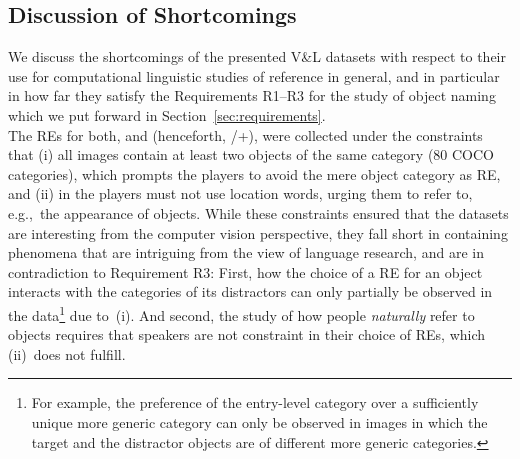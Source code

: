 {

\subsection{Discussion of Shortcomings}
We discuss the shortcomings of the presented V\&L datasets with respect to their use for computational linguistic studies of reference in general, and in particular in how far they satisfy the Requirements R1--R3 for the study of object naming which we put forward in Section~\ref{sec:requirements}. \\

The REs for both, \textit{} and \textit{} (henceforth, /+), were collected under the constraints that (i) all images contain at least two objects of the same category (80 COCO categories), which prompts the players to avoid the mere object category as RE, and (ii) in  the players must not use location words, urging them to refer to, e.g.,~the appearance of objects. %
%
While these constraints ensured that the datasets are interesting from the computer vision perspective, they fall short in containing phenomena that are intriguing from the view of language research,    
%
and are in contradiction to Requirement R3:  
First, how the choice of a RE for an object interacts with the categories of its distractors can only partially be observed in the data\footnote{For example, the preference of the entry-level category over a sufficiently unique more generic category can only be observed in images in which the target and the distractor objects are of different more generic categories.} due to~(i). 
And second, the study of how people \textit{naturally} refer to objects requires that speakers are not constraint in their choice of REs, which (ii)~does not fulfill.

}
